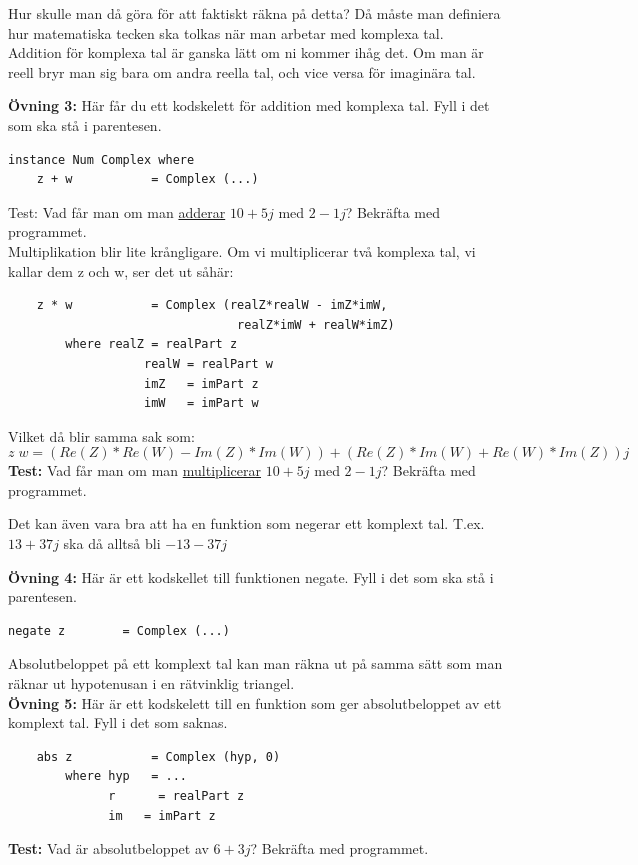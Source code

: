 \documentclass{article}
\begin{document}
Hur skulle man då göra för att faktiskt räkna på detta? Då måste man definiera hur matematiska tecken ska tolkas när man arbetar med komplexa tal.\\

Addition för komplexa tal är ganska lätt om ni kommer ihåg det. Om man är reell bryr man sig bara om andra reella tal, och vice versa för imaginära tal.

\textbf{Övning 3:} Här får du ett kodskelett för addition med komplexa tal. Fyll i det som ska stå i parentesen.
\begin{verbatim}
instance Num Complex where
    z + w           = Complex (...)
\end{verbatim}
Test: Vad får man om man \underline{adderar} $10 + 5j$ med $2 -1j$? Bekräfta med programmet.\\

Multiplikation blir lite krångligare. Om vi multiplicerar två komplexa tal, vi kallar dem z och w, ser det ut såhär:
\begin{verbatim}
    z * w           = Complex (realZ*realW - imZ*imW,
                                realZ*imW + realW*imZ)
        where realZ = realPart z
                   realW = realPart w
                   imZ   = imPart z
                   imW   = imPart w
\end{verbatim}
Vilket då blir samma sak som:
$$z \; w = (Re(Z) * Re(W) - Im(Z)*Im(W)) + (Re(Z)*Im(W) + Re(W)*Im(Z))j$$
\textbf{Test:} Vad får man om man \underline{multiplicerar} $10 + 5j$ med $2 -1j$? Bekräfta med programmet.

Det kan även vara bra att ha en funktion som negerar ett komplext tal. T.ex. $13+37j$ ska då alltså bli $-13-37j$

\textbf{Övning 4:} Här är ett kodskellet till funktionen negate. Fyll i det som ska stå i parentesen.
\begin{verbatim}
negate z        = Complex (...)
\end{verbatim}
Absolutbeloppet på ett komplext tal kan man räkna ut på samma sätt som man räknar ut hypotenusan i en rätvinklig triangel.\\

\textbf{Övning 5:} Här är ett kodskelett till en funktion som ger absolutbeloppet av ett komplext tal. Fyll i det som saknas.
\begin{verbatim}
    abs z           = Complex (hyp, 0)
        where hyp   = ...
              r      = realPart z
              im   = imPart z
\end{verbatim}
\textbf{Test:} Vad är absolutbeloppet av $6 + 3j$? Bekräfta med programmet.
\end{document}
